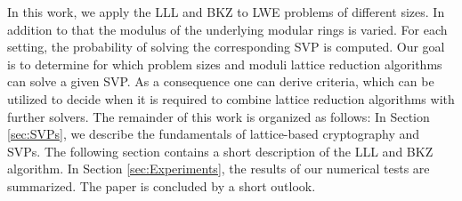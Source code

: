 In this work, we apply the LLL and BKZ to LWE problems of different sizes. In addition to that the modulus of the underlying modular rings is varied. For each setting, the probability of solving the corresponding SVP is computed. Our goal is to determine for which problem sizes and moduli lattice reduction algorithms can solve a given SVP. As a consequence one can derive criteria, which can be utilized to decide when it is required to combine lattice reduction algorithms with further solvers. The remainder of this work is organized as follows: In Section \ref{sec:SVPs}, we describe the fundamentals of lattice-based cryptography and SVPs. The following section contains a short description of the LLL and BKZ algorithm. In Section \ref{sec:Experiments}, the results of our numerical tests are summarized. The paper is concluded by a short outlook.
